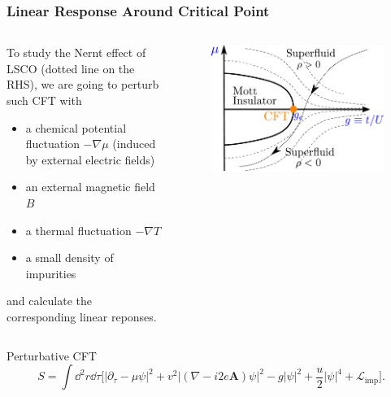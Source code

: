 \documentclass[10pt,aspectratio=43,xcolor=x11names,t]{beamer}%
\begin{document}
		\begin{frame}\frametitle{Linear Response Around Critical Point}
			\begin{columns}
				\begin{column}{0.5\textwidth}
					To study the Nernt effect of LSCO (dotted line on the RHS), we are going to perturb such CFT with 
					\begin{itemize}
						\item a chemical potential fluctuation $-\nabla\mu$ (induced by external electric fields)
						\item an external magnetic field $B$
						\item a thermal fluctuation $-\nabla T$
						\item a small density of impurities
					\end{itemize}
					and calculate the corresponding linear reponses.
				\end{column}
				\begin{column}{0.4\textwidth}
					\vspace{-1.5em}
					\begin{figure}[!htp]
						\centering
						\includegraphics[scale=0.35]{CFT.pdf}
					\end{figure}
					
				\end{column}
			\end{columns}

			\begin{block}{Perturbative CFT}
				\begin{equation*}
					S=\int\dd^2r\dd\tau\bigg[|\partial_\tau-\mu\psi|^2+v^2|(\nabla-i2e\bm{A})\psi|^2-g|\psi|^2+\dfrac{u}{2}|\psi|^4+\mathcal{L}_{\text{imp}}\bigg].
				\end{equation*}
			\end{block}
		\end{frame}
\end{document}
